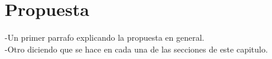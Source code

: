 \chapter{Propuesta}\label{chapter:proposal}

-Un primer parrafo explicando la propuesta en general.\\
-Otro diciendo que se hace en cada una de las secciones de este capitulo.\\